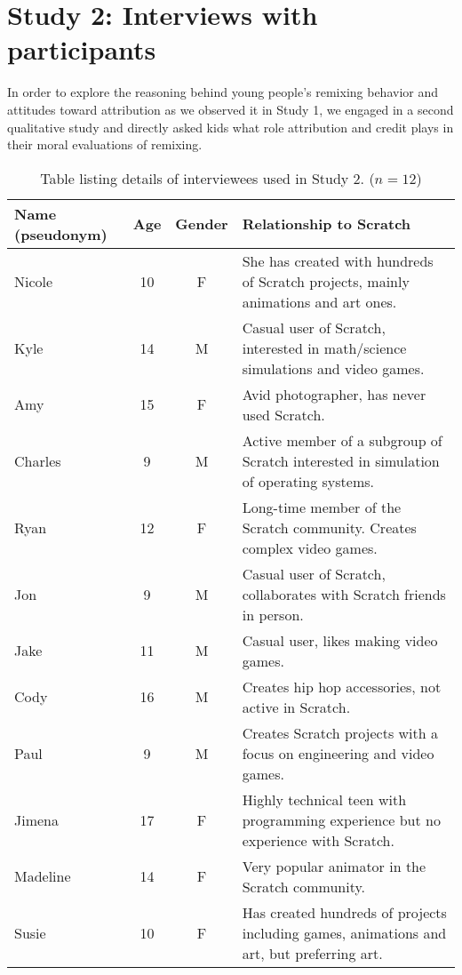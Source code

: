 \section{Study 2: Interviews with participants}

In order to explore the reasoning behind young people's remixing
behavior and attitudes toward attribution as we observed it in Study
1, we engaged in a second qualitative study and directly asked kids
what role attribution and credit plays in their moral evaluations of
remixing.

\begin{table*} \begin{tabular}{lccp{4.5in}} \hline
\textbf{Name (pseudonym)} & \textbf{Age} & \textbf{Gender} & \textbf{Relationship to Scratch}\\
\hline
Nicole & 10 & F & She has created with hundreds of Scratch projects, mainly animations and art ones. \\
Kyle & 14 & M & Casual user of Scratch, interested in math/science simulations and video games. \\
Amy & 15 & F & Avid photographer, has never used Scratch. \\
Charles & 9 & M & Active member of a subgroup of Scratch interested in simulation of operating systems.  \\
Ryan & 12 & F & Long-time member of the Scratch community. Creates complex video games. \\
Jon & 9 & M & Casual user of Scratch, collaborates with Scratch friends in person. \\
Jake & 11 & M & Casual user, likes making video games. \\
Cody & 16 & M & Creates hip hop accessories, not active in Scratch. \\
Paul & 9 & M & Creates Scratch projects with a focus on engineering and video games. \\
Jimena & 17 & F & Highly technical teen with programming experience but no experience with Scratch. \\
Madeline & 14 & F & Very popular animator  in the Scratch community. \\
Susie & 10 & F & Has created hundreds of projects including games, animations and art, but preferring art. \\
\hline
\end{tabular} \caption{Table listing details of interviewees used in Study 2. ($n=12$)} \label{tab:ints} \end{table*}

